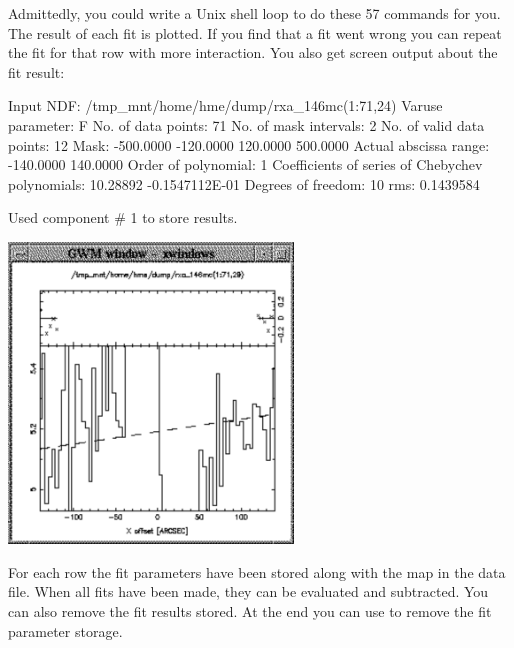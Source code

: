 \documentclass[11pt,noabs]{starlink}
\begin{document}
   Admittedly, you could write a Unix shell loop to do these 57 commands for
   you. The result of each fit is plotted. If you find that a fit went wrong
   you can repeat the fit for that row with more interaction. You also get
   screen output about the fit result:

\begin{terminalv}
Input NDF:  /tmp_mnt/home/hme/dump/rxa_146mc(1:71,24)
Varuse parameter:             F
No. of data points:          71
No. of mask intervals:        2
No. of valid data points:    12
Mask:
 -500.0000      -120.0000
  120.0000       500.0000
Actual abscissa range:
 -140.0000       140.0000
Order of polynomial: 1
Coefficients of series of Chebychev polynomials:
  10.28892     -0.1547112E-01
Degrees of freedom:          10
rms:                        0.1439584

Used component # 1 to store results.
\end{terminalv}

\begin{center}
\leavevmode\includegraphics[height=80mm]{sc1_fitcheby}
\end{center}

   For each row the fit parameters have been stored along with the map
   in the data file. When all fits have been made, they can be evaluated
   and subtracted. You can also remove the fit results stored. At the
   end you can use
\texttt{}
   to remove the fit parameter storage.

\begin{terminalv}
\end{terminalv}
\end{document}
